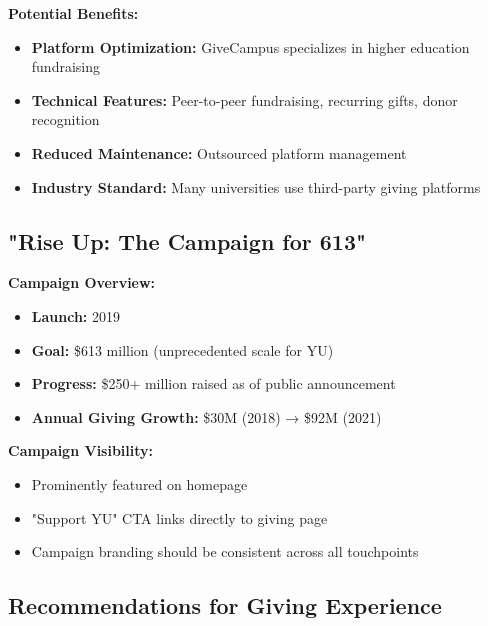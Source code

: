 \documentclass[12pt,letterpaper]{article}
\begin{document}
\textbf{Potential Benefits:}
\begin{itemize}[leftmargin=*]
    \item \textbf{Platform Optimization:} GiveCampus specializes in higher education fundraising
    \item \textbf{Technical Features:} Peer-to-peer fundraising, recurring gifts, donor recognition
    \item \textbf{Reduced Maintenance:} Outsourced platform management
    \item \textbf{Industry Standard:} Many universities use third-party giving platforms
\end{itemize}

\subsection{"Rise Up: The Campaign for 613"}

\textbf{Campaign Overview:}
\begin{itemize}[leftmargin=*]
    \item \textbf{Launch:} 2019
    \item \textbf{Goal:} \$613 million (unprecedented scale for YU)
    \item \textbf{Progress:} \$250+ million raised as of public announcement
    \item \textbf{Annual Giving Growth:} \$30M (2018) → \$92M (2021)
\end{itemize}

\textbf{Campaign Visibility:}
\begin{itemize}[leftmargin=*]
    \item Prominently featured on homepage
    \item "Support YU" CTA links directly to giving page
    \item Campaign branding should be consistent across all touchpoints
\end{itemize}

\subsection{Recommendations for Giving Experience}
\end{document}

